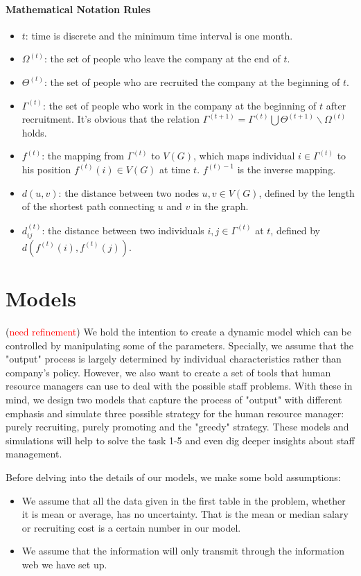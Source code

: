 \documentclass[tcn = 37075, sheet = false, abstract = false]{mcmthesis}
\begin{document}
\paragraph{Mathematical Notation Rules}
\begin{itemize}
\item $t$: time is discrete and the minimum time interval is one month.
\item $\Omega^{(t)}$: the set of people who leave the company at the end of $t$. \item $\Theta^{(t)}$: the set of people who are recruited the company at the beginning of $t$. 
\item $\Gamma^{(t)}$: the set of people who work in the company at the beginning of $t$ after recruitment. It's obvious that the relation $\Gamma^{(t+1)}=\Gamma^{(t)}\bigcup \Theta ^{(t+1)} \backslash \Omega^{(t)}$ holds.
\item $f^{(t)}$: the mapping from $\Gamma^{(t)}$ to $V(G)$, which maps individual $i\in \Gamma^{(t)}$ to his position $f^{(t)}(i) \in V(G)$ at time $t$. $f^{(t)-1}$ is the inverse mapping.
\item $d(u,v)$: the distance between two nodes $u, v\in V(G)$, defined by the length of the shortest path connecting $u$ and $v$ in the graph.
\item $d_{ij}^{(t)}$: the distance between two individuals $i, j\in  \Gamma^{(t)}$ at $t$, defined by $d(f^{(t)}(i),f^{(t)}(j))$.
\end{itemize}


\section{Models}

(\textcolor{red}{need refinement}) We hold the intention to create a dynamic model which can be controlled by manipulating some of the parameters. Specially, we assume that the "output" process is largely determined by individual characteristics rather than company's policy. However, we also want to create a set of tools that human resource managers can use to deal with the possible staff problems. With these in mind, we design two models that capture the process of "output" with different emphasis and simulate three possible strategy for the human resource manager: purely recruiting, purely promoting and the "greedy" strategy. These models and simulations will help to solve the task 1-5 and even dig deeper insights about staff management. 

Before delving into the details of our models, we make some bold assumptions:
\begin{itemize}
\item We assume that all the data given in the first table in the problem, whether it is mean or average, has no uncertainty. That is the mean or median salary or recruiting cost is a certain number in our model.
\item We assume that the information will only transmit through the information web we have set up.
\end{itemize}
\end{document}
